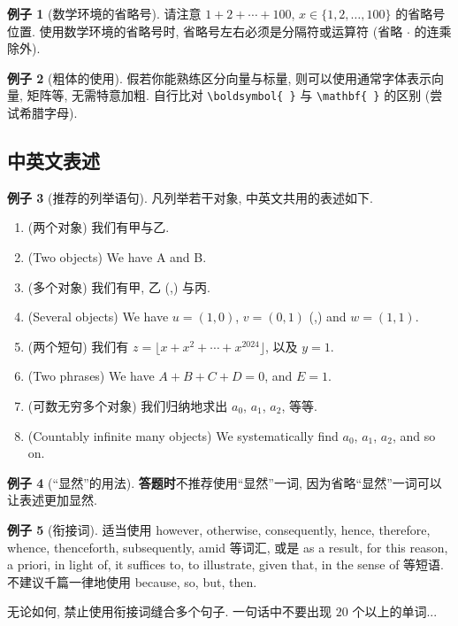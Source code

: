\documentclass[11pt]{ctexart}
\theoremstyle{definition}
\numberwithin{equation}{section}
\theoremstyle{definition}
\newtheorem*{example}{例子}
\theoremstyle{remark}
\begin{document}
\begin{example}[数学环境的省略号]
    请注意 $1+2+\cdots+100$, $x\in \{1,2,\ldots, 100\}$ 的省略号位置. 使用数学环境的省略号时, 省略号左右必须是分隔符或运算符 (省略 $\cdot$ 的连乘除外). 
\end{example}

\begin{example}[粗体的使用]
    假若你能熟练区分向量与标量, 则可以使用通常字体表示向量, 矩阵等, 无需特意加粗. 自行比对 \verb|\boldsymbol{ }| 与 \verb|\mathbf{ }| 的区别 (尝试希腊字母). 
\end{example}

\subsection{中英文表述}

\begin{example}[推荐的列举语句]
    凡列举若干对象, 中英文共用的表述如下. 
    \begin{enumerate}
        \item (两个对象) 我们有甲与乙. 
        \item (Two objects) We have A and B. 
        \item (多个对象) 我们有甲, 乙 (,) 与丙. 
        \item (Several objects) We have $u=(1,0)$, $v=(0,1)$ (,) and $w=(1,1)$. 
        \item (两个短句) 我们有 $z=\lfloor x+x^2+\cdots +x^{2024}\rfloor$, 以及 $y=1$. 
        \item (Two phrases) We have $A+B+C+D=0$, and $E=1$.
        \item (可数无穷多个对象) 我们归纳地求出 $a_0$, $a_1$, $a_2$, 等等. 
        \item (Countably infinite many objects) We systematically find $a_0$, $a_1$, $a_2$, and so on. 
    \end{enumerate}
\end{example}

\begin{example}[``显然''的用法]
    \textbf{答题时}不推荐使用``显然''一词, 因为省略``显然''一词可以让表述更加显然. 
\end{example}

\begin{example}[衔接词]
    适当使用 however, otherwise, consequently, hence, therefore, whence, thenceforth, subsequently, amid 等词汇, 或是 as a result, for this reason, a priori, in light of, it suffices to, to illustrate, given that, in the sense of 等短语. 不建议千篇一律地使用 because, so, but, then.
    \begin{pinked}
        无论如何, 禁止使用衔接词缝合多个句子. 一句话中不要出现 $20$ 个以上的单词...
    \end{pinked}
\end{example} 
\end{document}
